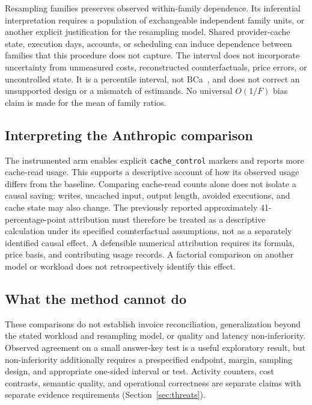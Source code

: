 \documentclass[11pt,a4paper]{article}
\begin{document}
Resampling families preserves observed within-family dependence. Its inferential interpretation
requires a population of exchangeable independent family units, or another explicit justification
for the resampling model. Shared provider-cache state, execution days, accounts, or scheduling
can induce dependence between families that this procedure does not capture. The interval does
not incorporate uncertainty from unmeasured costs, reconstructed counterfactuals, price errors, or
uncontrolled state. It is a percentile interval, not BCa~\cite{efron,davison}, and does not correct
an unsupported design or a mismatch of estimands. No universal $O(1/F)$ bias claim is made for
the mean of family ratios.

\subsection{Interpreting the Anthropic comparison}\label{sec:anthro}
The instrumented arm enables explicit \texttt{cache\_control} markers and reports more cache-read
usage. This supports a descriptive account of how its observed usage differs from the baseline.
Comparing cache-read counts alone does not isolate a causal saving: writes, uncached input,
output length, avoided executions, and cache state may also change. The previously reported
approximately 41-percentage-point attribution must therefore be treated as a descriptive
calculation under its specified counterfactual assumptions, not as a separately identified causal
effect. A defensible numerical attribution requires its formula, price basis, and contributing
usage records. A factorial comparison on another model or workload does not retrospectively
identify this effect.

\subsection{What the method cannot do}
These comparisons do not establish invoice reconciliation, generalization beyond the stated
workload and resampling model, or quality and latency non-inferiority. Observed agreement on a
small answer-key test is a useful exploratory result, but non-inferiority additionally requires a
prespecified endpoint, margin, sampling design, and appropriate one-sided interval or test.
Activity counters, cost contrasts, semantic quality, and operational correctness are separate
claims with separate evidence requirements (Section~\ref{sec:threats}).
\end{document}
